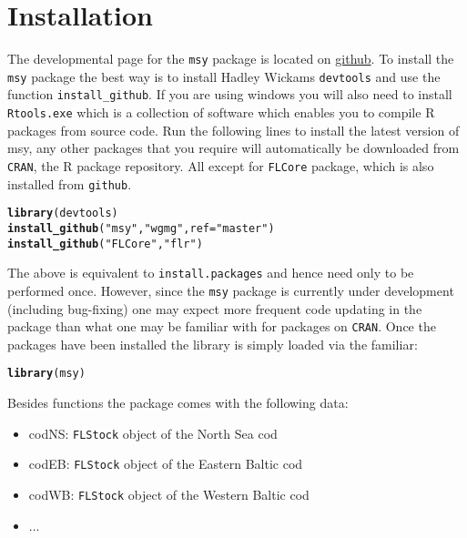 \documentclass[a4paper]{article}\usepackage{graphicx, color}
\makeatletter
\newcommand{\hlfunctioncall}[1]{\textcolor[rgb]{0.501960784313725,0,0.329411764705882}{\textbf{#1}}}%
\newcommand{\hlstring}[1]{\textcolor[rgb]{0.6,0.6,1}{#1}}%
\newenvironment{kframe}{%
 \def\at@end@of@kframe{}%
 \ifinner\ifhmode%
  \def\at@end@of@kframe{\end{minipage}}%
  \begin{minipage}{\columnwidth}%
 \fi\fi%
 \def\FrameCommand##1{\hskip\@totalleftmargin \hskip-\fboxsep
 \colorbox{shadecolor}{##1}\hskip-\fboxsep
     \hskip-\linewidth \hskip-\@totalleftmargin \hskip\columnwidth}%
 \MakeFramed {\advance\hsize-\width
   \@totalleftmargin\z@ \linewidth\hsize
   \@setminipage}}%
 {\par\unskip\endMakeFramed%
 \at@end@of@kframe}
\newenvironment{knitrout}{}{} %
\makeatother
\begin{document}
\section{Installation}
The developmental page for the \texttt{msy} package is located on \href{https://github.com/wgmg}{github}. To install the \texttt{msy} package the best way is to install Hadley Wickams \texttt{devtools} and use the function \texttt{install\_github}.  If you are using windows you will also need to install \texttt{Rtools.exe} which is a collection of software which enables you to compile R packages from source code.  Run the following lines to install the latest version of msy, any other packages that you require will automatically be downloaded from \texttt{CRAN}, the R package repository.  All except for \texttt{FLCore} package, which is also installed from \texttt{github}.
\begin{knitrout}
\color{fgcolor}\begin{kframe}
\begin{alltt}
\hlfunctioncall{library}(devtools)
\hlfunctioncall{install_github}(\hlstring{"msy"}, \hlstring{"wgmg"}, ref = \hlstring{"master"})
\hlfunctioncall{install_github}(\hlstring{"FLCore"}, \hlstring{"flr"})
\end{alltt}
\end{kframe}
\end{knitrout}

The above is equivalent to \texttt{install.packages} and hence need only to be performed once. However, since the \texttt{msy} package is currently under development (including bug-fixing) one may expect more frequent code updating in the package than what one may be familiar with for packages on \texttt{CRAN}. Once the packages have been installed the library is simply loaded via the familiar:
\begin{knitrout}
\color{fgcolor}\begin{kframe}
\begin{alltt}
\hlfunctioncall{library}(msy)
\end{alltt}
\end{kframe}
\end{knitrout}

Besides functions the package comes with the following data:
\begin{itemize}
  \item codNS: \texttt{FLStock} object of the North Sea cod
  \item codEB: \texttt{FLStock} object of the Eastern Baltic cod
  \item codWB: \texttt{FLStock} object of the Western Baltic cod
  \item ...
\end{itemize}
\end{document}
